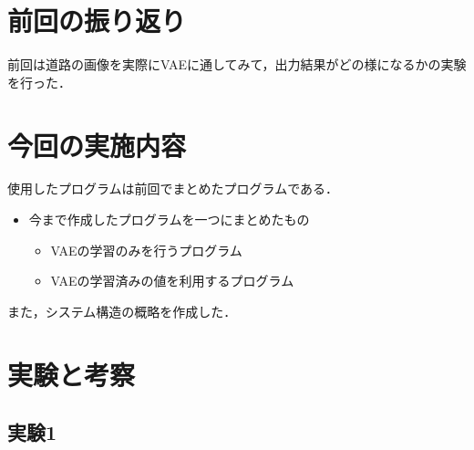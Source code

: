 \documentclass[twocolumn, a4j]{jsarticle}
\begin{document}

\section{前回の振り返り}
前回は道路の画像を実際にVAEに通してみて，出力結果がどの様になるかの実験を行った．


\section{今回の実施内容}
使用したプログラムは前回でまとめたプログラムである．
\begin{itemize}
  \item 今まで作成したプログラムを一つにまとめたもの
  \begin{itemize}
    \item VAEの学習のみを行うプログラム
    \item VAEの学習済みの値を利用するプログラム
  \end{itemize}
\end{itemize}

また，システム構造の概略を作成した．

\section{実験と考察}
\subsection{実験1}
\end{document}
